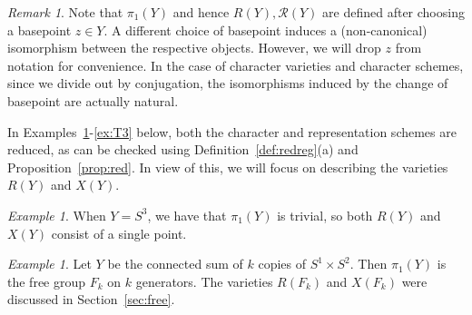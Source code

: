 \documentclass [11pt]{amsart}
\theoremstyle{remark}
\newtheorem {remark}[theorem]{Remark}
\newtheorem {example}[theorem]{Example}
\def\Rep {R}
\def\Rs {\mathscr{R}}
\def\Char {X}
\begin{document}
\begin{remark}
Note that $\pi_1(Y)$ and hence $\Rep(Y), \Rs(Y)$ are defined after choosing a basepoint $z \in Y$. A different choice of basepoint induces a (non-canonical) isomorphism between the respective objects. However, we will drop $z$ from notation for convenience. In the case of character varieties and character schemes, since we divide out by conjugation, the isomorphisms induced by the change of basepoint are actually natural.
\end{remark}

In Examples~\ref{ex:S3}-\ref{ex:T3} below, both the character and representation schemes are reduced, as can be checked using Definition~\ref{def:redreg}(a) and Proposition~\ref{prop:red}. In view of this, we will focus on describing the varieties $R(Y)$ and $X(Y)$.

\begin{example}
\label{ex:S3}
When $Y=S^3$, we have that $\pi_1(Y)$ is trivial, so both $\Rep(Y)$ and $\Char(Y)$ consist of a single point.
\end{example}

\begin{example}
\label{ex:free}
Let $Y$ be the connected sum of $k$ copies of $S^1 \times S^2$. Then $\pi_1(Y)$ is the free group $F_k$ on $k$ generators. The varieties $\Rep(F_k)$ and $\Char(F_k)$ were discussed in Section~\ref{sec:free}.
\end{example}
\end{document}
